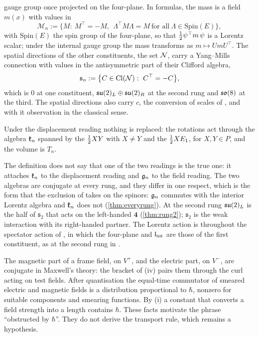 \begin{definition}
\begin{enumerate}[label=(A\arabic*),leftmargin=2.6em,itemsep=2pt]
gauge group once projected on the four-plane. In formulas, the mass is a field $m(x)$ with values in
\begin{equation}
\label{eq:Mspace}
\mathcal M_n:=\bigl\{M:\ M^\top=-M,\ \ \Lambda^\top M\Lambda=M\ \text{for all}\ \Lambda\in\mathrm{Spin}(E)\bigr\},
\end{equation}
with $\mathrm{Spin}(E)$ the spin group of the four-plane, so that $\tfrac12\psi^\top m\,\psi$ is a Lorentz scalar; under the internal gauge
group the mass transforms as $m\mapsto UmU^\top$. The spatial
directions of the other constituents, the set $\mathcal N$, carry a Yang--Mills connection with values in the antisymmetric part of their Clifford
algebra,
\begin{equation}
\label{eq:sn}
\mathfrak s_n:=\bigl\{C\in\mathrm{Cl}(\mathcal N):\ C^\top=-C\bigr\},
\end{equation}
which is $0$ at one constituent, $\mathfrak{su}(2)_L\oplus\mathfrak{su}(2)_R$ at the second rung and $\mathfrak{so}(8)$ at the third. The spatial directions also carry $c$, the
conversion of scales of , and with it observation in the classical sense.
\end{enumerate}
Under the displacement reading nothing is replaced: the rotations act through the algebra $\mathfrak k_n$ spanned by the $\tfrac12 XY$ with $X\ne Y$
and the $\tfrac12 XE_1$, for $X,Y\in P$, and the volume is $T_n$.
\end{definition}

The definition does not say that one of the two readings is the true one: it attaches $\mathfrak k_n$ to the displacement reading and $\mathfrak g_n$ to the
field reading. The two algebras are conjugate at every rung, and they differ in one respect, which is the form that the exclusion of
 takes on the spinors: $\mathfrak g_n$ commutes with the interior Lorentz algebra and $\mathfrak k_n$ does not (\cref{thm:everyrung}). At the
second rung $\mathfrak{su}(2)_L$ is the half of $\mathfrak s_2$ that acts on the left-handed $\mathbf4$ (\cref{thm:rung2}); $\mathfrak s_2$ is the weak
interaction with its right-handed partner. The Lorentz action is throughout the spectator action of , in which the four-plane
and $\mathfrak l_{\rm int}$ are those of the first constituent, as at the second rung in .

\begin{remark}
\label{rem:hbar}
The magnetic part of a frame field, on $V^+$, and the electric part, on $V^-$, are conjugate in Maxwell's theory: the bracket of
(iv) pairs them through the curl acting on test fields. After quantisation the equal-time commutator of smeared electric and
magnetic fields is a distribution proportional to $\hbar$, nonzero for suitable components and smearing functions. By (i) a
constant that converts a field strength into a length contains $\hbar$. These facts motivate the phrase ``obstructed by $\hbar$''. They do
not derive the transport rule, which remains a hypothesis.
\end{remark}

